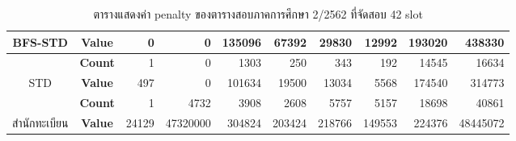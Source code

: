 \begin{table}[]
{\begin{tabular}{@{}ccrrrrrrrr@{}}
    \multirow{-2}{*}{BFS-STD}                    & \textbf{Value}                        & 0                          & 0                        & 135096                        & 67392                        & 29830                        & 12992                       & 193020                        & 438330                        \\ \midrule
    {\color[HTML]{FE0000} }                      & {\color[HTML]{FE0000} \textbf{Count}} & {\color[HTML]{FE0000} 1}   & {\color[HTML]{FE0000} 0} & {\color[HTML]{FE0000} 1303}   & {\color[HTML]{FE0000} 250}   & {\color[HTML]{FE0000} 343}   & {\color[HTML]{FE0000} 192}  & {\color[HTML]{FE0000} 14545}  & {\color[HTML]{FE0000} 16634}  \\ \cmidrule(l){2-10} 
    \multirow{-2}{*}{{\color[HTML]{FE0000} STD}} & {\color[HTML]{FE0000} \textbf{Value}} & {\color[HTML]{FE0000} 497} & {\color[HTML]{FE0000} 0} & {\color[HTML]{FE0000} 101634} & {\color[HTML]{FE0000} 19500} & {\color[HTML]{FE0000} 13034} & {\color[HTML]{FE0000} 5568} & {\color[HTML]{FE0000} 174540} & {\color[HTML]{FE0000} 314773} \\ \midrule
                                                 & \textbf{Count}                        & 1                          & 4732                     & 3908                          & 2608                         & 5757                         & 5157                        & 18698                         & 40861                         \\ \cmidrule(l){2-10} 
    \multirow{-2}{*}{สำนักทะเบียน}                  & \textbf{Value}                        & 24129                      & 47320000                 & 304824                        & 203424                       & 218766                       & 149553                      & 224376                        & 48445072                      \\ \bottomrule
    \end{tabular}%
    }
    \caption{ตารางแสดงค่า penalty ของตารางสอบภาคการศึกษา 2/2562 ที่จัดสอบ 42 slot}
    \label{tab:result_table_262}
\end{table}
